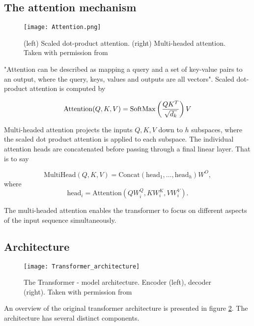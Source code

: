 \documentclass[../../thesis.tex]{subfiles}
\begin{document}
\subsection{The attention mechanism}

\begin{figure}[h]
    \texttt{[image: Attention.png]}
    \centering 
    \label{fig:attention}
    \caption{(left) Scaled dot-product attention. (right) Multi-headed attention. Taken with permission from \cite{vaswani2023attention}}
\end{figure}

"Attention can be described as mapping a query and a set of key-value pairs to an output, where the query, keys, values and outputs are all vectors". Scaled dot-product attention is computed by 

\begin{equation}
    \text{Attention}(Q,K,V) = \operatorname{SoftMax} \left(\frac{QK^T}{\sqrt{d_k}}\right)V
\end{equation}

Multi-headed attention projects the inputs $Q,K,V$ down to $h$ subspaces, where the scaled dot product attention is applied to each subspace. The individual attention heads are concatenated before passing through a final linear layer. That is to say 

\begin{equation}
    \text{MultiHead}(Q,K,V) = \text{Concat}(\text{head}_1,\dots, \text{head}_h)W^O,
\end{equation}
where
\begin{equation}
    \text{head}_i = \text{Attention}(QW_i^Q,KW_i^K,VW_i^V). 
\end{equation}

The multi-headed attention enables the transformer to focus on different aspects of the input sequence simultaneously. 

\subsection{Architecture}


\begin{figure}[h]
    \texttt{[image: Transformer\_architecture]}
    \centering 
    \label{fig:transformer}
    \caption{The Transformer - model architecture. Encoder (left), decoder (right). Taken with permission from \cite{vaswani2023attention}}
\end{figure}
An overview of the original transformer architecture is presented in figure \ref{fig:transformer}. The architecture has several distinct components.
\newline
\end{document}
